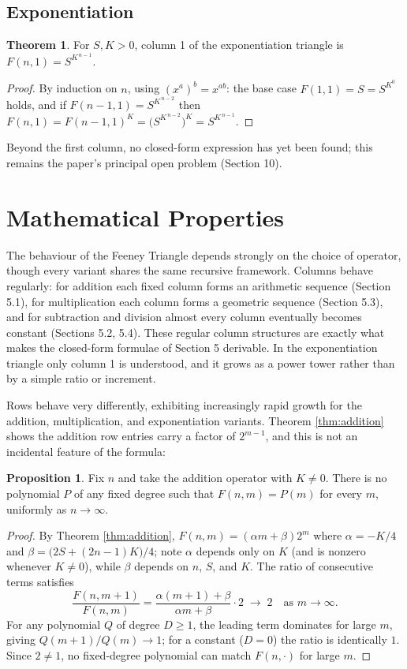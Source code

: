 \documentclass[11pt]{article}
\theoremstyle{definition}
\newtheorem{theorem}{Theorem}[section]
\newtheorem{proposition}{Proposition}[section]
\begin{document}
\subsection{Exponentiation}

\begin{theorem}\label{thm:exponentiation}
For $S,K>0$, column 1 of the exponentiation triangle is $F(n,1) = S^{K^{\,n-1}}$.
\end{theorem}

\begin{proof}
By induction on $n$, using $(x^a)^b=x^{ab}$: the base case $F(1,1)=S=S^{K^0}$ holds, and if $F(n-1,1)=S^{K^{\,n-2}}$ then $F(n,1)=F(n-1,1)^K = \bigl(S^{K^{\,n-2}}\bigr)^K = S^{K^{\,n-1}}$.
\end{proof}

Beyond the first column, no closed-form expression has yet been found; this remains the paper's principal open problem (Section 10).

\section{Mathematical Properties}

The behaviour of the Feeney Triangle depends strongly on the choice of operator, though every variant shares the same recursive framework. Columns behave regularly: for addition each fixed column forms an arithmetic sequence (Section 5.1), for multiplication each column forms a geometric sequence (Section 5.3), and for subtraction and division almost every column eventually becomes constant (Sections 5.2, 5.4). These regular column structures are exactly what makes the closed-form formulae of Section 5 derivable. In the exponentiation triangle only column 1 is understood, and it grows as a power tower rather than by a simple ratio or increment.

Rows behave very differently, exhibiting increasingly rapid growth for the addition, multiplication, and exponentiation variants. Theorem \ref{thm:addition} shows the addition row entries carry a factor of $2^{m-1}$, and this is not an incidental feature of the formula:

\begin{proposition}\label{prop:nopoly}
Fix $n$ and take the addition operator with $K\ne0$. There is no polynomial $P$ of any fixed degree such that $F(n,m)=P(m)$ for every $m$, uniformly as $n\to\infty$.
\end{proposition}

\begin{proof}
By Theorem \ref{thm:addition}, $F(n,m) = (\alpha m+\beta)2^m$ where $\alpha = -K/4$ and $\beta = \bigl(2S+(2n-1)K\bigr)/4$; note $\alpha$ depends only on $K$ (and is nonzero whenever $K\ne0$), while $\beta$ depends on $n$, $S$, and $K$. The ratio of consecutive terms satisfies
\[
\frac{F(n,m+1)}{F(n,m)} = \frac{\alpha(m+1)+\beta}{\alpha m+\beta}\cdot 2 \;\longrightarrow\; 2 \quad \text{as } m\to\infty.
\]
For any polynomial $Q$ of degree $D\ge1$, the leading term dominates for large $m$, giving $Q(m+1)/Q(m)\to1$; for a constant ($D=0$) the ratio is identically $1$. Since $2\ne1$, no fixed-degree polynomial can match $F(n,\cdot)$ for large $m$.
\end{proof}
\end{document}
